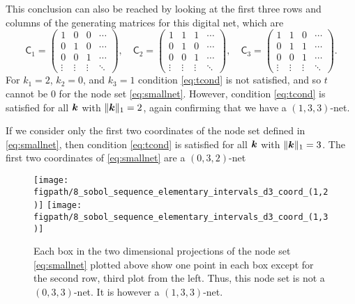 \documentclass{svproc}
\newcommand{\figpath}{Figures}
\begin{document}
This conclusion can also be reached by looking at the first three rows and columns of the generating matrices for this digital net, which are
\begin{equation*}
	\mathsf{C}_1 = \begin{pmatrix}
		1 & 0 & 0 & \cdots \\ 0 & 1 & 0 & \cdots \\ 0 & 0 & 1 & \cdots \\ \vdots & \vdots & \vdots & \ddots
	\end{pmatrix}, \quad
	\mathsf{C}_2 = \begin{pmatrix}
		1 & 1 & 1 & \cdots \\ 0 & 1 & 0 & \cdots \\ 0 & 0 & 1 & \cdots \\ \vdots & \vdots & \vdots & \ddots
	\end{pmatrix}, \quad
	\mathsf{C}_3 = \begin{pmatrix}
	1 & 1 & 0 & \cdots \\ 0 & 1 & 1 & \cdots \\ 0 & 0 & 1 & \cdots \\ \vdots & \vdots & \vdots & \ddots
\end{pmatrix}.
\end{equation*}
For $k_1=2$, $k_2 = 0$, and $k_3 = 1$ condition \eqref{eq:tcond} is not satisfied, and so $t$ cannot be $0$ for the node set  \eqref{eq:smallnet}.  However, condition \eqref{eq:tcond} is satisfied for all ${\boldsymbol{k}}$ with $\lVert {\boldsymbol{k}} \rVert_1 = 2$, again confirming that we have a $(1,3,3)$-net.

If we consider only the first two coordinates of the node set defined in \eqref{eq:smallnet}, then  condition \eqref{eq:tcond} is satisfied for all ${\boldsymbol{k}}$ with $\lVert {\boldsymbol{k}} \rVert_1 = 3$.  The first two coordinates of \eqref{eq:smallnet} are a $(0,3,2)$-net



\begin{figure}
	\centering
	\texttt{[image: \\figpath/8\_sobol\_sequence\_elementary\_intervals\_d3\_coord\_(1,2)]}
	\texttt{[image: \\figpath/8\_sobol\_sequence\_elementary\_intervals\_d3\_coord\_(1,3)]}
	\caption{Each box in the two dimensional projections of the node set \eqref{eq:smallnet} plotted above show one point in each box except for the second row, third plot from the left.  Thus, this node set is not a $(0,3,3)$-net.  It is however a $(1,3,3)$-net.  \label{fig:elementinterval}}
\end{figure}
\end{document}
